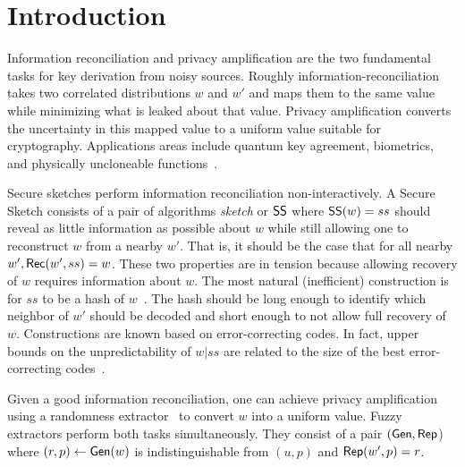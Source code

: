 
\section{Introduction}
Information reconciliation and privacy amplification are the two fundamental tasks for key derivation from noisy sources.  Roughly information-reconciliation takes two correlated distributions $w$ and $w'$ and maps them to the same value while minimizing what is leaked about that value.  Privacy amplification converts the uncertainty in this mapped value to a uniform value suitable for cryptography.  Applications areas include quantum key agreement, biometrics, and physically uncloneable functions~\cite{bennett1988privacy,dodis2008fuzzy}. 

Secure sketches perform information reconciliation non-interactively.  A Secure Sketch consists of a pair of algorithms \emph{sketch} or ${\mathsf{SS}}$ where ${\mathsf{SS}}(w) = ss$ should reveal as little information as possible about $w$ while still allowing one to reconstruct $w$ from a nearby $w'$. That is, it should be the case that for all nearby $w', {\mathsf{Rec}}(w', ss) = w$.  These two properties are in tension because allowing recovery of $w$ requires information about $w$.  The most natural (inefficient) construction is for $ss$ to be a hash of $w$~\cite{skoric2009efficient,fuller2016fuzzy,woodage2017new,fuller2020fuzzy}. The hash should be long enough to identify which neighbor of $w'$ should be decoded and short enough to not allow full recovery of $w$. Constructions are known based on error-correcting codes.  In fact, upper bounds on the unpredictability of $w | ss$ are related to the size of the best error-correcting codes~\cite{dodis2008fuzzy,fuller2020computational}. 

Given a good information reconciliation, one can achieve privacy amplification using a randomness extractor~\cite{nisan1993randomness} to convert $w$ into a uniform value.
  Fuzzy extractors perform both tasks simultaneously.  They consist of a pair $({\mathsf{Gen}}, {\mathsf{Rep}}$) where $(r, p)\leftarrow {\ensuremath{\mathsf{Gen}}}(w)$ is indistinguishable from $(u, p)$ and ${\mathsf{Rep}}(w', p) =r$.
  
